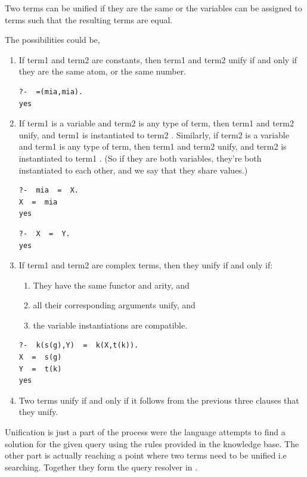 \documentclass[thesis-solanki.tex]{subfiles}
\begin{document}
Two terms can be unified if they are the same or the variables can be assigned to terms such that the resulting terms are equal.

The possibilities could be,
\begin{enumerate}
\item If term1 and term2 are constants, then term1 and term2 unify if and only if they are the same atom, or the same number.
\begin{verbatim}
?-  =(mia,mia).
yes
\end{verbatim}

\item If term1 is a variable and term2 is any type of term, then term1 and term2 unify, and term1 is instantiated to term2 . Similarly, if 
term2 is a variable and term1 is any type of term, then term1 and term2 unify, and term2 is instantiated to term1 . (So if they are both 
variables, they’re both instantiated to each other, and we say that they share values.)
\begin{verbatim}
?-  mia  =  X.
X  =  mia 
yes
\end{verbatim}

\begin{verbatim}
?-  X  =  Y. 
yes
\end{verbatim}

\item If term1 and term2 are complex terms, then they unify if and only if:

\begin{enumerate}
\item They have the same functor and arity, and

\item all their corresponding arguments unify, and

\item the variable instantiations are compatible.
\end{enumerate}
\begin{verbatim}
?-  k(s(g),Y)  =  k(X,t(k)).
X  =  s(g) 
Y  =  t(k) 
yes
\end{verbatim}


\item Two terms unify if and only if it follows from the previous three clauses that they unify.
\end{enumerate} 

Unification is just a part of the process were the language attempts to find a solution for the given query using the rules provided in the 
knowledge base. The other part is actually reaching a point where two terms need to be unified i.e searching. Together they form the query 
resolver in .
\end{document}
